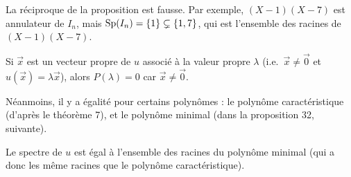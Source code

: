 \begin{rmkn}
	{\color{red} La réciproque de la proposition est fausse.} Par exemple, $(X-1)(X-7)$\/ est annulateur de $I_n$, mais $\operatorname{Sp}(I_n) = \{1\} \subsetneq \{1,7\}$, qui est l'ensemble des racines de $(X-1)(X-7)$.
\end{rmkn}

\begin{prv}
	Si $\vec{x}$\/ est un vecteur propre de $u$\/ associé à la valeur propre $\lambda$\/ (i.e.\ $\vec{x} \neq \vec{0}$\/ et $u(\vec{x}) = \lambda \vec{x}$), alors $P(\lambda) = 0$\/ car $\vec{x} \neq \vec{0}$.
\end{prv}

Néanmoins, il y a égalité pour certains polynômes : le polynôme caractéristique (d'après le théorème 7), et le polynôme minimal (dans la proposition 32, suivante).

\begin{prop}
	Le spectre de $u$\/ est égal à l'ensemble des racines du polynôme minimal (qui a donc les même racines que le polynôme caractéristique).
\end{prop}


